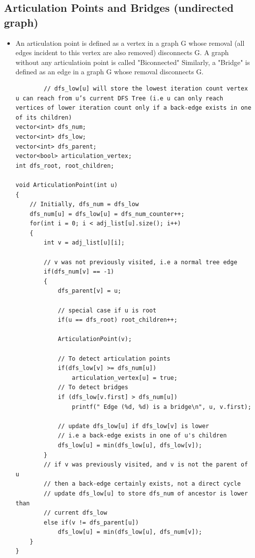 \documentclass[8pt, a4paper, oneside, twocolumn]{extarticle}
\begin{document}
\subsection{Articulation Points and Bridges (undirected graph)}
\begin{itemize}
    \item An articulation point is defined as a vertex in a graph G whose removal (all edges incident to this vertex are also removed) disconnects G. A graph without any articulatioin point is called "Biconnected" Similarly, a "Bridge" is defined as an edge in a graph G whose removal disconnects G.
    \begin{verbatim}
        // dfs_low[u] will store the lowest iteration count vertex u can reach from u’s current DFS Tree (i.e u can only reach vertices of lower iteration count only if a back-edge exists in one of its children)
vector<int> dfs_num;
vector<int> dfs_low;
vector<int> dfs_parent;
vector<bool> articulation_vertex;
int dfs_root, root_children;

void ArticulationPoint(int u)
{
    // Initially, dfs_num = dfs_low
    dfs_num[u] = dfs_low[u] = dfs_num_counter++;
    for(int i = 0; i < adj_list[u].size(); i++)
    {
        int v = adj_list[u][i];
        
        // v was not previously visited, i.e a normal tree edge
        if(dfs_num[v] == -1)
        {
            dfs_parent[v] = u;
            
            // special case if u is root
            if(u == dfs_root) root_children++;

            ArticulationPoint(v);
            
            // To detect articulation points
            if(dfs_low[v] >= dfs_num[u])
                articulation_vertex[u] = true;
            // To detect bridges
            if (dfs_low[v.first] > dfs_num[u])
                printf(" Edge (%d, %d) is a bridge\n", u, v.first);
            
            // update dfs_low[u] if dfs_low[v] is lower
            // i.e a back-edge exists in one of u's children
            dfs_low[u] = min(dfs_low[u], dfs_low[v]);
        }
        // if v was previously visited, and v is not the parent of u
        // then a back-edge certainly exists, not a direct cycle
        // update dfs_low[u] to store dfs_num of ancestor is lower than
        // current dfs_low
        else if(v != dfs_parent[u])
            dfs_low[u] = min(dfs_low[u], dfs_num[v]);
    }
}


\end{verbatim}
\end{itemize}
\end{document}
